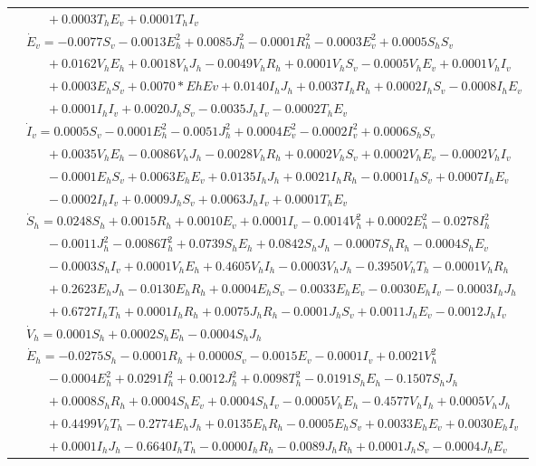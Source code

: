 \documentclass[9pt]{article}
\numberwithin{equation}{section}
\begin{document}
\begin{table}[ht]
\begin{tabularx}{1\linewidth}{|l|X|}
        & $\quad\;\;+0.0003T_hE_v+0.0001T_hI_v$ \\
        & $\dot{E}_v=-0.0077S_v-0.0013E_h^2+0.0085J_h^2-0.0001R_h^2-0.0003E_v^2+0.0005S_hS_v$ \\
        & $\quad\;\;+0.0162V_hE_h+0.0018V_hJ_h-0.0049V_hR_h+0.0001V_hS_v-0.0005V_hE_v+0.0001V_hI_v$ \\
        & $\quad\;\;+0.0003E_hS_v+0.0070*EhEv+0.0140I_hJ_h+0.0037I_hR_h+0.0002I_hS_v-0.0008I_hE_v$ \\
        & $\quad\;\;+0.0001I_hI_v+0.0020J_hS_v-0.0035J_hI_v-0.0002T_hE_v$ \\
        & $\dot{I}_v=0.0005S_v-0.0001E_h^2-0.0051J_h^2+0.0004E_v^2-0.0002I_v^2+0.0006S_hS_v$ \\
        & $\quad\;\;+0.0035V_hE_h-0.0086V_hJ_h-0.0028V_hR_h+0.0002V_hS_v+0.0002V_hE_v-0.0002V_hI_v$ \\
        & $\quad\;\;-0.0001E_hS_v+0.0063E_hE_v+0.0135I_hJ_h+0.0021I_hR_h-0.0001I_hS_v+0.0007I_hE_v$ \\
        & $\quad\;\;-0.0002I_hI_v+0.0009J_hS_v+0.0063J_hI_v+0.0001T_hE_v$ \\
        \hline\hline
        &  $\dot{S}_h=0.0248S_h+0.0015R_h+0.0010E_v+0.0001I_v-0.0014V_h^2+0.0002E_h^2-0.0278I_h^2$ \\
        & $\quad\;\;-0.0011J_h^2-0.0086T_h^2+0.0739S_hE_h+0.0842S_hJ_h-0.0007S_hR_h-0.0004S_hE_v$ \\
        & $\quad\;\;-0.0003S_hI_v+0.0001V_hE_h+0.4605V_hI_h-0.0003V_hJ_h-0.3950V_hT_h-0.0001V_hR_h$ \\
        & $\quad\;\;+0.2623E_hJ_h-0.0130E_hR_h+0.0004E_hS_v-0.0033E_hE_v-0.0030E_hI_v-0.0003I_hJ_h$ \\
        & $\quad\;\;+0.6727I_hT_h+0.0001I_hR_h+0.0075J_hR_h-0.0001J_hS_v+0.0011J_hE_v-0.0012J_hI_v$ \\
        & $\dot{V}_h=0.0001S_h+0.0002S_hE_h-0.0004S_hJ_h$ \\
        & $\dot{E}_h=-0.0275S_h-0.0001R_h+0.0000S_v-0.0015E_v-0.0001I_v+0.0021V_h^2$ \\
        & $\quad\;\;-0.0004E_h^2+0.0291I_h^2+0.0012J_h^2+0.0098T_h^2-0.0191S_hE_h-0.1507S_hJ_h$ \\
        & $\quad\;\;+0.0008S_hR_h+0.0004S_hE_v+0.0004S_hI_v-0.0005V_hE_h-0.4577V_hI_h+0.0005V_hJ_h$ \\
        & $\quad\;\;+0.4499V_hT_h-0.2774E_hJ_h+0.0135E_hR_h-0.0005E_hS_v+0.0033E_hE_v+0.0030E_hI_v$ \\
        & $\quad\;\;+0.0001I_hJ_h-0.6640I_hT_h-0.0000I_hR_h-0.0089J_hR_h+0.0001J_hS_v-0.0004J_hE_v$ \\

\end{tabularx}
\end{table}
\end{document}
